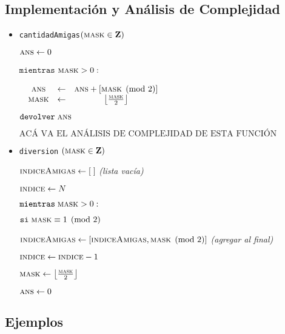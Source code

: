 \subsection*{Implementación y Análisis de Complejidad}
\begin{itemize}
	\item \texttt{cantidadAmigas}$(\textsc{mask} \in \mathbf{Z})$
	
	$\textsc{ans} \leftarrow 0$
	
	$\texttt{mientras}$ $\textsc{mask} > 0:$

	$\begin{matrix}
	& \textsc{ans} & \leftarrow  & \textsc{ans} + \left [ \textsc{mask} \pmod{2}\right ] \\ 
	& \textsc{mask} & \leftarrow  & \left \lfloor \frac{\textsc{mask}}{2} \right \rfloor 
	\end{matrix}$
	
	$\texttt{devolver} \; \textsc{ans}$
	
	$\boxed{\text{ACÁ VA EL ANÁLISIS DE COMPLEJIDAD DE ESTA FUNCIÓN}}$
	
	\item \texttt{diversion} $ (\textsc{mask} \in \mathbf{Z}) $
	
	$\textsc{indiceAmigas} \leftarrow [ \; ]$ \textit{(lista vacía)}
	
	$\textsc{indice} \leftarrow N$ 
	
	$\texttt{mientras} \; \textsc{mask} > 0:$
	
	\quad $ \texttt{si} \; \textsc{mask} \equiv 1 \pmod{2}$ 
	
	\quad \quad $ \textsc{indiceAmigas} \leftarrow [\textsc{indiceAmigas}, \textsc{mask} \pmod{2} ] $ \textit{(agregar al final)}
	
	\quad $\textsc{indice} \leftarrow \textsc{indice} - 1$
	
	\quad $\textsc{mask} \leftarrow \left \lfloor \frac{\textsc{mask}}{2} \right \rfloor$ 
	
	$\textsc{ans} \leftarrow 0$
	
\end{itemize}

\subsection*{Ejemplos}